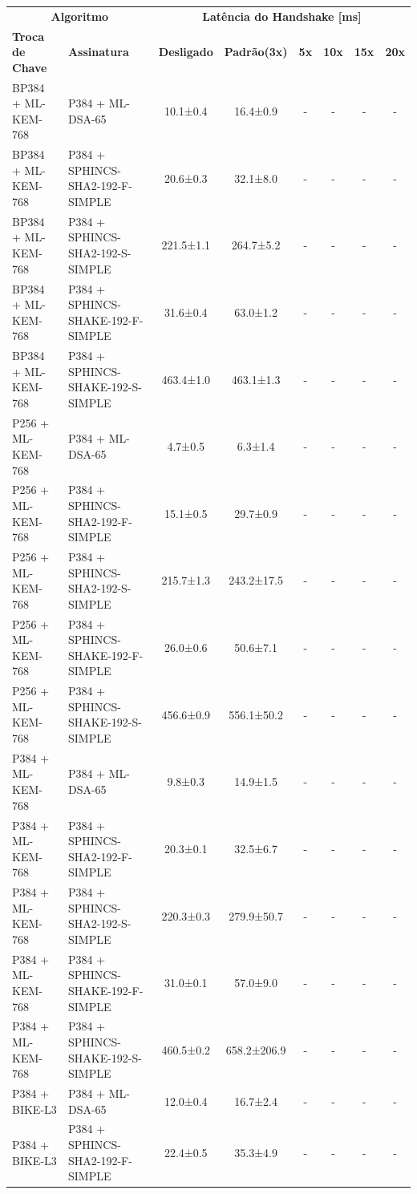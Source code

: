 \documentclass[10pt]{article}
\begin{document}
\centering
\small
\begin{tabular}{@{}l l c c c c c c@{}}
\toprule
\multicolumn{2}{c}{\textbf{Algoritmo}} & \multicolumn{6}{c}{\textbf{Latência do Handshake [ms]}} \\
\cmidrule(lr){1-2}\cmidrule(lr){3-8}
\textbf{Troca de Chave} & \textbf{Assinatura} & \textbf{Desligado} & \textbf{Padrão(3x)} & \textbf{5x} & \textbf{10x} & \textbf{15x} & \textbf{20x} \\
\midrule
BP384 + ML-KEM-768 & P384 + ML-DSA-65 & 10.1±0.4 & 16.4±0.9 & - & - & - & - \\
BP384 + ML-KEM-768 & P384 + SPHINCS-SHA2-192-F-SIMPLE & 20.6±0.3 & 32.1±8.0 & - & - & - & - \\
BP384 + ML-KEM-768 & P384 + SPHINCS-SHA2-192-S-SIMPLE & 221.5±1.1 & 264.7±5.2 & - & - & - & - \\
BP384 + ML-KEM-768 & P384 + SPHINCS-SHAKE-192-F-SIMPLE & 31.6±0.4 & 63.0±1.2 & - & - & - & - \\
BP384 + ML-KEM-768 & P384 + SPHINCS-SHAKE-192-S-SIMPLE & 463.4±1.0 & 463.1±1.3 & - & - & - & - \\
P256 + ML-KEM-768 & P384 + ML-DSA-65 & 4.7±0.5 & 6.3±1.4 & - & - & - & - \\
P256 + ML-KEM-768 & P384 + SPHINCS-SHA2-192-F-SIMPLE & 15.1±0.5 & 29.7±0.9 & - & - & - & - \\
P256 + ML-KEM-768 & P384 + SPHINCS-SHA2-192-S-SIMPLE & 215.7±1.3 & 243.2±17.5 & - & - & - & - \\
P256 + ML-KEM-768 & P384 + SPHINCS-SHAKE-192-F-SIMPLE & 26.0±0.6 & 50.6±7.1 & - & - & - & - \\
P256 + ML-KEM-768 & P384 + SPHINCS-SHAKE-192-S-SIMPLE & 456.6±0.9 & 556.1±50.2 & - & - & - & - \\
P384 + ML-KEM-768 & P384 + ML-DSA-65 & 9.8±0.3 & 14.9±1.5 & - & - & - & - \\
P384 + ML-KEM-768 & P384 + SPHINCS-SHA2-192-F-SIMPLE & 20.3±0.1 & 32.5±6.7 & - & - & - & - \\
P384 + ML-KEM-768 & P384 + SPHINCS-SHA2-192-S-SIMPLE & 220.3±0.3 & 279.9±50.7 & - & - & - & - \\
P384 + ML-KEM-768 & P384 + SPHINCS-SHAKE-192-F-SIMPLE & 31.0±0.1 & 57.0±9.0 & - & - & - & - \\
P384 + ML-KEM-768 & P384 + SPHINCS-SHAKE-192-S-SIMPLE & 460.5±0.2 & 658.2±206.9 & - & - & - & - \\
P384 + BIKE-L3 & P384 + ML-DSA-65 & 12.0±0.4 & 16.7±2.4 & - & - & - & - \\
P384 + BIKE-L3 & P384 + SPHINCS-SHA2-192-F-SIMPLE & 22.4±0.5 & 35.3±4.9 & - & - & - & - \\

\end{tabular}
\end{document}
